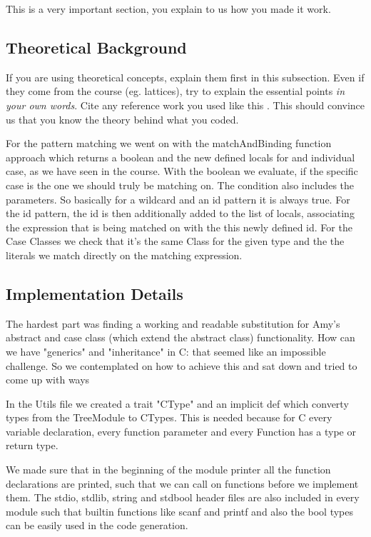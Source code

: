 This is a very important section, you explain to us how you made it work.

\subsection{Theoretical Background}
If you are using theoretical concepts, explain them first in this subsection.
Even if they come from the course (eg. lattices), try to explain the essential
points \emph{in your own words}. Cite any reference work you used like this
\cite{TigerBook}. This should convince us that you know the theory behind what
you coded.

For the pattern matching we went on with the matchAndBinding function approach which returns a boolean and the new defined locals for and individual case, as we have seen in the course.
With the boolean we evaluate, if the specific case is the one we should truly be matching on.
The condition also includes the parameters. So basically for a wildcard and an id pattern it is always true.
For the id pattern, the id is then additionally added to the list of locals, associating the expression that is being matched on with the this newly defined id.
For the Case Classes we check that it's the same Class for the given type and the the literals we match directly on the matching expression.

\subsection{Implementation Details}
%
The hardest part was finding a working and readable substitution for Amy's abstract and case class (which extend the abstract class) functionality.
How can we have "generics" and "inheritance" in C: that seemed like an impossible challenge.
So we contemplated on how to achieve this and sat down and tried to come up with ways

In the Utils file we created a trait "CType" and an implicit def which converty types from the TreeModule to CTypes.
This is needed because for C every variable declaration, every function parameter and every Function has a type or return type.

We made sure that in the beginning of the module printer all the function declarations are printed, such that we can call on functions before we implement them.
The stdio, stdlib, string and stdbool header files are also included in every module such that builtin functions like scanf and printf and also the bool types can be easily used in the code generation.
